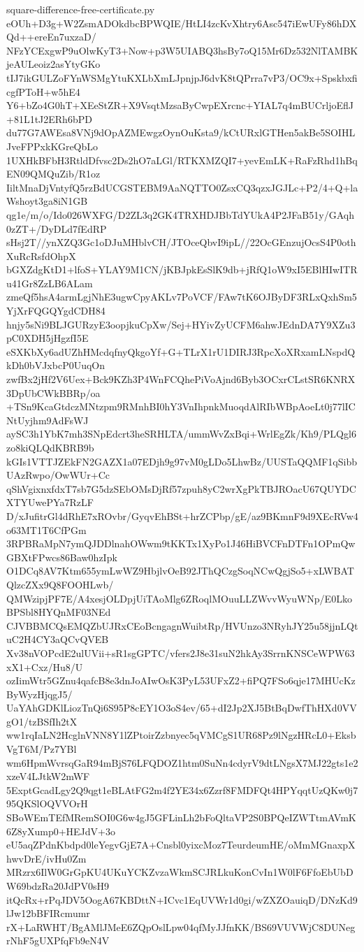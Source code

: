 \documentclass[11pt]{article}
\theoremstyle{definition}
\theoremstyle{remark}
\begin{document}
\begin{filecontents*}[overwrite]{square-difference-free-certificate.py}
eOUh+D3g+W2ZsmADOkdbcBPWQIE/HtLI4zcKvXhtry6Asc547iEwUFy86hDXQd++ereEn7uxzaD/
NFzYCExgwP9uOlwKyT3+Now+p3W5UIABQ3hsBy7oQ15Mr6Dz532NlTAMBKjeAULeoiz2asYtyGKo
tIJ7ikGULZoFYnWSMgYtuKXLbXmLJpnjpJ6dvK8tQPrra7vP3/OC9x+SpskbxficgfPToH+w5hE4
Y6+bZo4G0hT+XEeStZR+X9VsqtMzsaByCwpEXrcnc+YIAL7q4mBUCrljoEflJ+81L1tJ2ERh6bPD
du77G7AWEsa8VNj9dOpAZMEwgzOynOuKsta9/kCtURxlGTHen5akBe5SOIHLJveFPPxkKGreQbLo
1UXHkBFbH3RtldDfvsc2Ds2hO7aLGl/RTKXMZQI7+yevEmLK+RaFzRhd1hBqEN09QMQuZib/R1oz
IiltMnaDjVntyfQ5rzBdUCGSTEBM9AaNQTTO0ZsxCQ3qzxJGJLc+P2/4+Q+laWshoyt3ga8iN1GB
qg1e/m/o/Ido026WXFG/D2ZL3q2GK4TRXHDJBbTdYUkA4P2JFaB51y/GAqh0zZT+/DyDLd7fEdRP
sHsj2T//ynXZQ3Gc1oDJuMHblvCH/JTOceQbvI9ipL//22OcGEnzujOcsS4P0othXuRcRsfdOhpX
bGXZdgKtD1+lfoS+YLAY9M1CN/jKBJpkEsSlK9db+jRfQ1oW9xI5EBlHIwITRu41Gr8ZzLB6ALam
zmeQf5hsA4armLgjNhE3ugwCpyAKLv7PoVCF/FAw7tK6OJByDF3RLxQxhSm5YjXrFQGQYgdCDH84
hnjy5sNi9BLJGURzyE3oopjkuCpXw/Sej+HYivZyUCFM6ahwJEdnDA7Y9XZu3pC0XDH5jHgzfI5E
eSXKbXy6adUZhHMcdqfnyQkgoYf+G+TLrX1rU1DIRJ3RpcXoXRxamLNspdQkDh0bVJxbcP0UuqOn
zwfBx2jHf2V6Uex+Bck9KZh3P4WnFCQhePiVoAjnd6Byb3OCxrCLstSR6KNRX3DpUbCWkBBRp/oa
+TSn9KcaGtdczMNtzpm9RMnhBI0hY3VnIhpnkMuoqdAlRIbWBpAoeLt0j77lICNtUyjhm9AdFsWJ
aySC3h1YbK7mh3SNpEdcrt3heSRHLTA/ummWvZxBqi+WrlEgZk/Kh9/PLQgl6zo8kiQLQdKBRB9b
kGIs1VTTJZEkFN2GAZX1a07EDjh9g97vM0gLDo5LhwBz/UUSTaQQMF1qSibbUAzRwpo/OwWUr+Cc
qShVgixnxfdxT7sb7G5dzSEbOMsDjRf57zpuh8yC2wrXgPkTBJROacU67QUYDCXTYUwePYa7RzLF
D/xJufitrGl4dRhE7xROvbr/GyqvEhBSt+hrZCPbp/gE/az9BKmnF9d9XEcRVw4o63MT1T6CfPGm
3RPBRaMpN7ymQJDDlnahOWwm9tKKTx1XyPo1J46HiBVCFnDTFn1OPmQwGBXtFPwcs86Baw0hzIpk
O1DCq8AV7Ktm655ymLwWZ9HbjlvOeB92JThQCzgSoqNCwQgjSo5+xLWBATQlzcZXx9Q8FOOHLwb/
QMWzipjPF7E/A4xesjOLDpjUiTAoMlg6ZRoqlMOuuLLZWvvWyuWNp/E0LkoBPSbl8HYQnMF03NEd
CJVBBMCQsEMQZbUJRxCEoBcngagnWuibtRp/HVUnzo3NRyhJY25u58jjnLQtuC2H4CY3aQCvQVEB
Xv38nVOPcdE2ulUVii+sR1sgGPTC/vfers2J8e31suN2hkAy3SrrnKNSCeWPW63xX1+Cxz/Hu8/U
ozIimWtr5GZnu4qafcB8e3dnJoAIwOsK3PyL53UFxZ2+fiPQ7FSo6qje17MHUcKzByWyzHjqgJ5/
UaYAhGDKlLiozTnQi6S95P8cEY1O3oS4ev/65+dI2Jp2XJ5BtBqDwfThHXd0VVgO1/tzBSfIh2tX
ww1rqIaLN2HcglnVNN8Y1lZPtoirZzbnyec5qVMCgS1UR68Pz9lNgzHRcL0+EksbVgT6M/Pz7YBl
wm6HpmWvrsqGaR94mBjS76LFQDOZ1htm0SuNn4cdyrV9dtLNgsX7MJ22gts1e2xzeV4LJtkW2mWF
5ExptGcadLgy2Q9qgt1eBLAtFG2m4f2YE34x6Zzrf8FMDFQt4HPYqqtUzQKw0j795QKSlOQVVOrH
SBoWEmTEfMRemSOI0G6w4gJ5GFLinLh2bFoQltaVP2S0BPQeIZWTtmAVmK6Z8yXump0+HEJdV+3o
eU5aqZPdnKbdpd0leYegvGjE7A+Cnsbl0yixcMoz7TeurdeumHE/oMmMGnaxpXhwvDrE/ivHu0Zm
MRzrx6IlW0GrGpKU4UKuYCKZvzaWkmSCJRLkuKonCvIn1W0lF6FfoEbUbDW69bdzRa20JdPV0sH9
itQcRx+rPqJDV5OogA67KBDttN+ICvc1EqUVWr1d0gi/wZXZOauiqD/DNzKd9lJw12bBFIRcmumr
rX+LaRWHT/BgAMlJMeE6ZQpOslLpw04qfMyJJfnKK/BS69VUVWjC8DUNegrNhF5gUXPfqFb9eN4V

\end{filecontents*}
\end{document}

